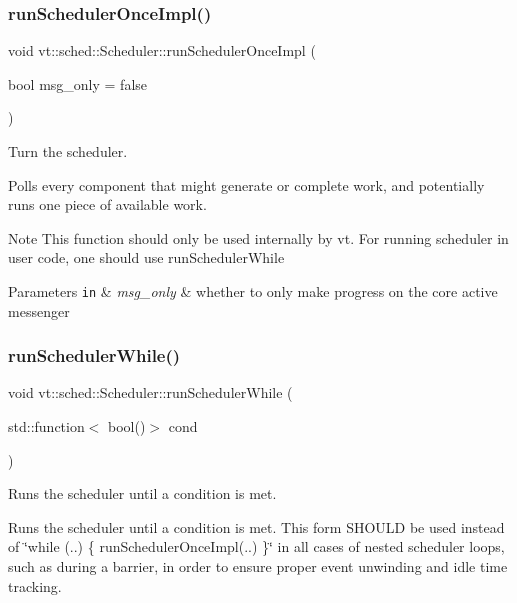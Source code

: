 \subsubsection{\texorpdfstring{run\+Scheduler\+Once\+Impl()}{runSchedulerOnceImpl()}}
{\footnotesize\ttfamily void vt\+::sched\+::\+Scheduler\+::run\+Scheduler\+Once\+Impl (\begin{DoxyParamCaption}\item[{bool}]{msg\+\_\+only = {\ttfamily false} }\end{DoxyParamCaption})}



Turn the scheduler. 

Polls every component that might generate or complete work, and potentially runs one piece of available work.

\begin{DoxyNote}{Note}
This function should only be used internally by vt. For running scheduler in user code, one should use {\ttfamily run\+Scheduler\+While} 
\end{DoxyNote}

\begin{DoxyParams}[1]{Parameters}
\mbox{\tt in}  & {\em msg\+\_\+only} & whether to only make progress on the core active messenger \\
\hline
\end{DoxyParams}
\mbox{\label{structvt_1_1sched_1_1_scheduler_a9c130fc0ccbf237633420a7aa35069a4}} 
\subsubsection{\texorpdfstring{run\+Scheduler\+While()}{runSchedulerWhile()}}
{\footnotesize\ttfamily void vt\+::sched\+::\+Scheduler\+::run\+Scheduler\+While (\begin{DoxyParamCaption}\item[{std\+::function$<$ bool()$>$}]{cond }\end{DoxyParamCaption})}



Runs the scheduler until a condition is met. 

Runs the scheduler until a condition is met. This form S\+H\+O\+U\+LD be used instead of \char`\"{}while (..) \{ run\+Scheduler\+Once\+Impl(..) \}\char`\"{} in all cases of nested scheduler loops, such as during a barrier, in order to ensure proper event unwinding and idle time tracking.


